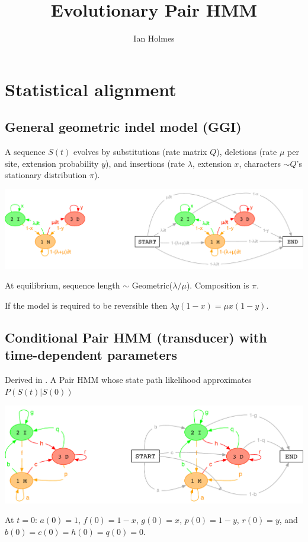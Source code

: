 \documentclass{article}
\title{Evolutionary Pair HMM}
\author{Ian Holmes}
\begin{document}

\section{Statistical alignment}

\subsection{General geometric indel model (GGI)}

A sequence $S(t)$ evolves by
substitutions (rate matrix $Q$),
deletions (rate $\mu$ per site, extension probability $y$),
and
insertions (rate $\lambda$, extension $x$,
characters $\sim Q$'s stationary distribution $\pi$).

\includegraphics[width=\textwidth]{InstantHMM.pdf}

At equilibrium, sequence length $\sim$ Geometric($\lambda/\mu$). Composition is $\pi$.

If the model is required to be reversible then $\lambda y(1-x) = \mu x(1-y)$.

\subsection{Conditional Pair HMM (transducer) with time-dependent parameters}
Derived in \cite{Holmes2020}.
A Pair HMM whose state path likelihood approximates $P(S(t)|S(0))$

\includegraphics[width=\textwidth]{PairHMM.pdf}

At $t=0$: $a(0)=1$, $f(0)=1-x$, $g(0)=x$, $p(0)=1-y$, $r(0)=y$, and $b(0)=c(0)=h(0)=q(0)=0$.
\end{document}
